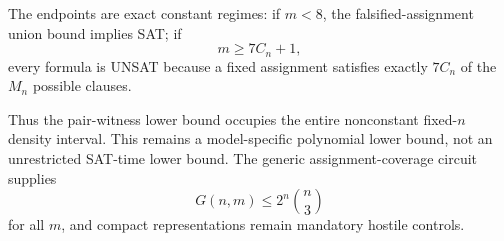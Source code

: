 The endpoints are exact constant regimes:
if \(m<8\), the falsified-assignment union bound implies SAT; if
\[
m\ge7C_n+1,
\]
every formula is UNSAT because a fixed assignment satisfies exactly \(7C_n\) of the \(M_n\) possible clauses.

Thus the pair-witness lower bound occupies the entire nonconstant fixed-\(n\) density interval. This remains a model-specific polynomial lower bound, not an unrestricted SAT-time lower bound. The generic assignment-coverage circuit supplies
\[
G(n,m)\le2^n\binom n3
\]
for all \(m\), and compact representations remain mandatory hostile controls.

